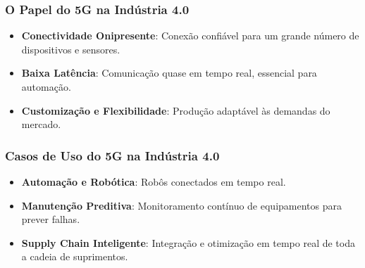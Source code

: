 \begin{frame}
    \frametitle{O Papel do 5G na Indústria 4.0}
    \begin{itemize}
        \item \textbf{Conectividade Onipresente}: Conexão confiável para um grande número de dispositivos e sensores.
        \item \textbf{Baixa Latência}: Comunicação quase em tempo real, essencial para automação.
        \item \textbf{Customização e Flexibilidade}: Produção adaptável às demandas do mercado.
    \end{itemize}
\end{frame}

\begin{frame}
    \frametitle{Casos de Uso do 5G na Indústria 4.0}
    \begin{itemize}
        \item \textbf{Automação e Robótica}: Robôs conectados em tempo real.
        \item \textbf{Manutenção Preditiva}: Monitoramento contínuo de equipamentos para prever falhas.
        \item \textbf{Supply Chain Inteligente}: Integração e otimização em tempo real de toda a cadeia de suprimentos.
    \end{itemize}
\end{frame}


